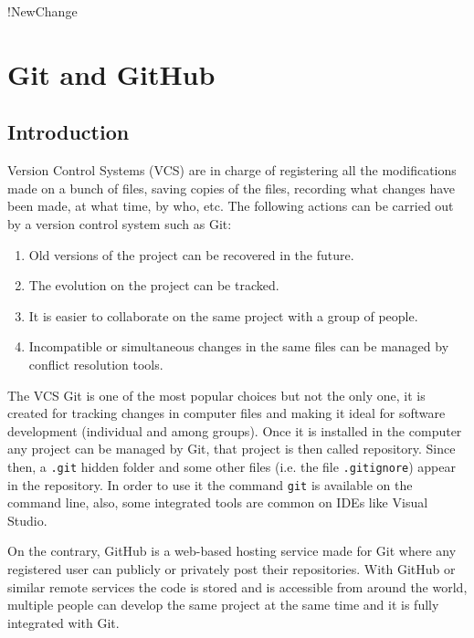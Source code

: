 !NewChange

\chapter{Git and GitHub}


    \section{Introduction}
    
Version Control Systems (VCS) are in charge of registering all the modifications made on a bunch of files, saving copies of the files, 
recording what changes have been made, at what time, by who, etc. 
The following actions can be carried out by a version control system such as Git: 

\begin{enumerate}
    \item Old versions of the project can be recovered in the future.
    \item The evolution on the project can be tracked.
    \item It is easier to collaborate on the same project with a group of people.
    \item Incompatible or simultaneous changes in the same files can be managed by conflict resolution tools.
\end{enumerate}

The VCS Git is one of the most popular choices but not the only one, it is created for tracking changes in computer files and making it ideal for software development (individual and among groups). 
Once it is installed in the computer any project can be managed by Git, that project is then called repository.
Since then, a \texttt{.git} hidden folder and some other files (i.e. the file \texttt{.gitignore}) appear in the repository.
In order to use it the command \texttt{git} is available on the command line, also, some integrated tools are common on IDEs like Visual Studio.

On the contrary, GitHub is a web-based hosting service made for Git where any registered user can publicly or privately post their repositories. 
With GitHub or similar remote services the code is stored and is accessible from around the world, multiple people can develop the same project at the same time
and it is fully integrated with Git.

